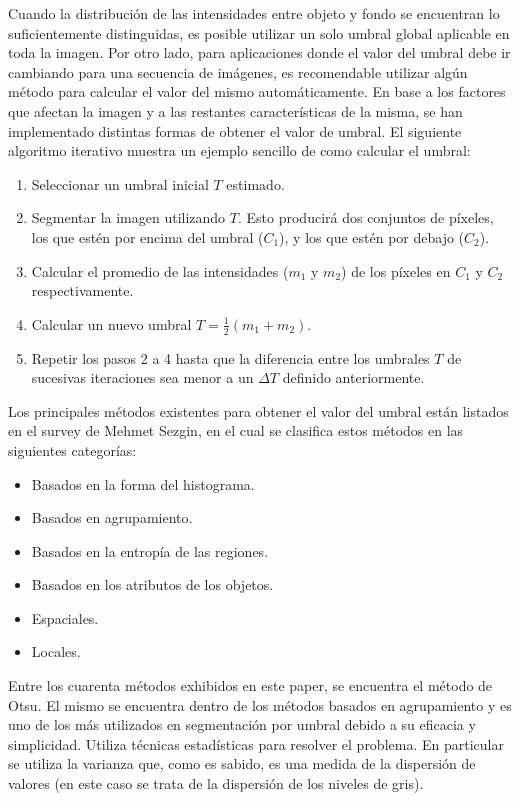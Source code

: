 Cuando la distribución de las intensidades entre objeto y fondo se encuentran lo suficientemente distinguidas, es posible utilizar un solo umbral global aplicable en toda la imagen. Por otro lado, para aplicaciones donde el valor del umbral debe ir cambiando para una secuencia de imágenes, es recomendable utilizar algún método para calcular el valor del mismo automáticamente. En base a los factores que afectan la imagen y a las restantes características de la misma, se han implementado distintas formas de obtener el valor de umbral. El siguiente algoritmo iterativo muestra un ejemplo sencillo de como calcular el umbral:

\begin{enumerate}
\item Seleccionar un umbral inicial $T$ estimado.
\item Segmentar la imagen utilizando $T$. Esto producirá dos conjuntos de píxeles, los que estén por encima del umbral ($C_1$), y los que estén por debajo ($C_2$).
\item Calcular el promedio de las intensidades ($m_1$ y $m_2$) de los píxeles en $C_1$ y $C_2$ respectivamente.
\item Calcular un nuevo umbral $T = \frac{1}{2}(m_1 + m_2)$.
\item Repetir los pasos 2 a 4 hasta que la diferencia entre los umbrales $T$ de sucesivas iteraciones sea menor a un ${\Delta}T$ definido anteriormente.
\end{enumerate}

Los principales métodos existentes para obtener el valor del umbral están listados en el survey de Mehmet Sezgin\cite{surveyThreshold}, en el cual se clasifica estos métodos en las siguientes categorías:
\begin{itemize}
\item Basados en la forma del histograma.
\item Basados en agrupamiento.
\item Basados en la entropía de las regiones.
\item Basados en los atributos de los objetos.
\item Espaciales.
\item Locales.
\end{itemize}

Entre los cuarenta métodos exhibidos en este paper, se encuentra el método de Otsu\cite{otsu}. El mismo se encuentra dentro de los métodos basados en agrupamiento y es uno de los más utilizados en segmentación por umbral debido a su eficacia y simplicidad. Utiliza técnicas estadísticas para resolver el problema. En particular se utiliza la varianza que, como es sabido, es una medida de la dispersión de valores (en este caso se trata de la dispersión de los niveles de gris).


